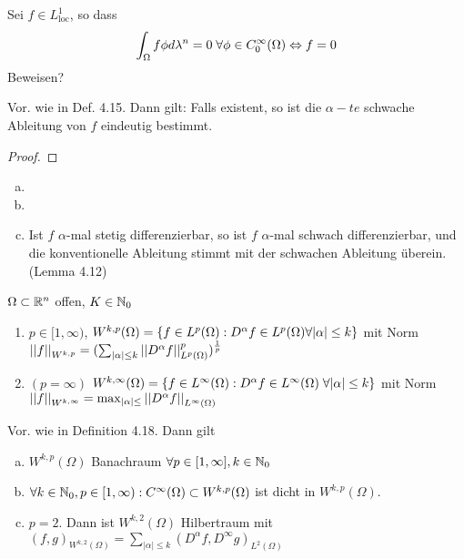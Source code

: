 \documentclass[ngerman]{report}
\begin{document}
	\begin{bem*}
		Sei $f\in L^1_{\text{loc}}$, so dass 
			$$\int_\Omega f \phi d\lambda^n = 0 \; \forall \phi \in C^\infty_0(\Omega) \overset{}{\Leftrightarrow} f = 0$$
	\todog[Übungsbeweis] Beweisen?
	\end{bem*}

	\begin{thm}
		Vor. wie in Def. 4.15. Dann gilt: Falls existent, so ist die $\alpha-te$ schwache Ableitung von $f$ eindeutig bestimmt. 
	\end{thm}

	\begin{proof}
		\todor	
	\end{proof}

	\begin{bsp}
		\begin{enumerate}[a)]
			\item {}
			\item
			\item Ist $f$ $\alpha$-mal stetig differenzierbar, so ist $f$ $\alpha$-mal schwach differenzierbar, und die konventionelle Ableitung stimmt mit der schwachen Ableitung überein. (Lemma 4.12)
		\end{enumerate}
	\end{bsp}

	\begin{definition}[Sobolevräume]
		$\Omega \subset \mathbb{R}^n$ offen, $K\in\mathbb{N}_0$	
		\begin{enumerate}
			\item $p\in [1,\infty)$, $W^{k,p}(\Omega) = \{f\in L^p(\Omega): D^\alpha f\in L^p(\Omega) \forall |\alpha| \leq k\}$ mit Norm $\left\lvert \left\lvert f \right\rvert \right\rvert_{W^{k,p}} = (\sum_{|\alpha| \leq k} \left\lvert \left\lvert D^\alpha f \right\rvert \right\rvert^p_{L^p(\Omega)})^{\frac{1}{p}}$
		\item $(p = \infty)$ $W^{k,\infty}(\Omega) = \{f\in L^\infty(\Omega): D^\alpha f \in L^\infty(\Omega) \; \forall |\alpha| \leq k\}$ mit Norm $\left\lvert \left\lvert f \right\rvert \right\rvert_{W^{k,\infty}} = \max_{|\alpha| \leq} \left\lvert \left\lvert D^\alpha f \right\rvert \right\rvert_{L^\infty(\Omega)}$
		\end{enumerate}
	\end{definition}

	\begin{thm}
		Vor. wie in Definition 4.18. Dann gilt 
			\begin{enumerate}[a)]
				\item $W^{k,p}(\Omega)$ Banachraum $\forall p\in[1,\infty], k\in \mathbb{N}_0$
				\item $\forall k\in \mathbb{N}_0, p\in [1,\infty): C^\infty(\Omega) \subset W^{k,p}(\Omega)$ ist dicht in $W^{k,p}(\Omega)$.
				\item $p =2$. Dann ist $W^{k,2}(\Omega)$ Hilbertraum mit $(f,g)_{W^{k,2}(\Omega)} = \sum_{|\alpha| \leq k} (D^\alpha f, D^\infty g)_{L^2(\Omega)}$
			\end{enumerate}
	\end{thm}
\end{document}

